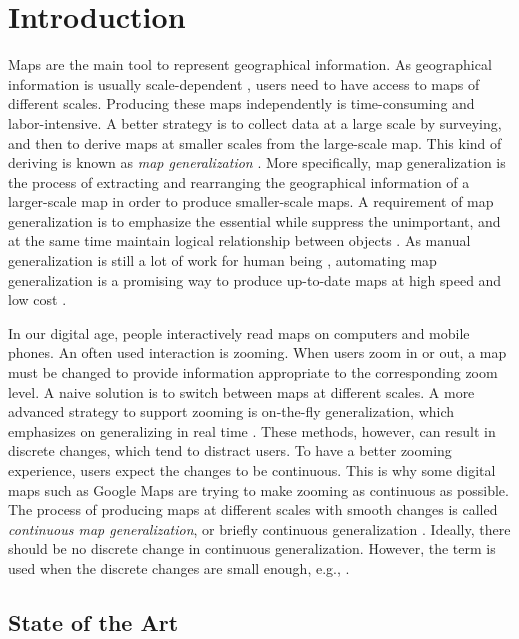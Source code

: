\chapter{Introduction}
\label{chap:introduction}


Maps are the main tool to represent geographical information.
As geographical information is usually scale-dependent
\parencite{Weibel1997},
users need to have access to maps of different scales.
Producing these maps independently is
time-consuming and labor-intensive.
A better strategy is 
to collect data at a large scale by surveying, 
and then to derive maps 
at smaller scales from the large-scale map.
This kind of deriving is known as \emph{map generalization}
\parencite{Li2007}.
More specifically, map generalization is 
the process of extracting and rearranging 
the geographical information of a larger-scale map 
in order to produce smaller-scale maps.
A requirement of map generalization is to emphasize the 
essential while suppress the unimportant,
and at the same time maintain logical relationship between 
objects \parencite{Weibel1997}.
As manual generalization is still a lot of work for human being
\parencite{Duchene2014},
automating map generalization is a promising way 
to produce up-to-date maps at high speed and low cost 
\parencite{Mackaness2017Generalization}.


In our digital age, people interactively read maps 
on computers and mobile phones.
An often used interaction is zooming. 
When users zoom in or out, 
a map must be changed to provide information 
appropriate to the corresponding zoom level.
A naive solution is 
to switch between maps at different scales.
A more advanced strategy to support zooming is  
on-the-fly generalization,
which emphasizes on generalizing in real time
\parencite{Weibel2017Fly}.
These methods, however, can result in discrete changes, which
tend to distract users.
To have a better zooming experience, 
users expect the changes to be continuous.
This is why some digital maps such as Google Maps 
are trying to make zooming as continuous as possible.
The process of producing maps at different scales
with smooth changes 
is called \emph{continuous map generalization},
or briefly continuous generalization
\parencite{Sester2005_CG}.
Ideally, there should be no discrete change 
in continuous generalization.
However, the term is used when 
the discrete changes are small enough,
e.g., \textcite{Suba2016Road}.



\section{State of the Art}
\label{sec:Intro_State}


